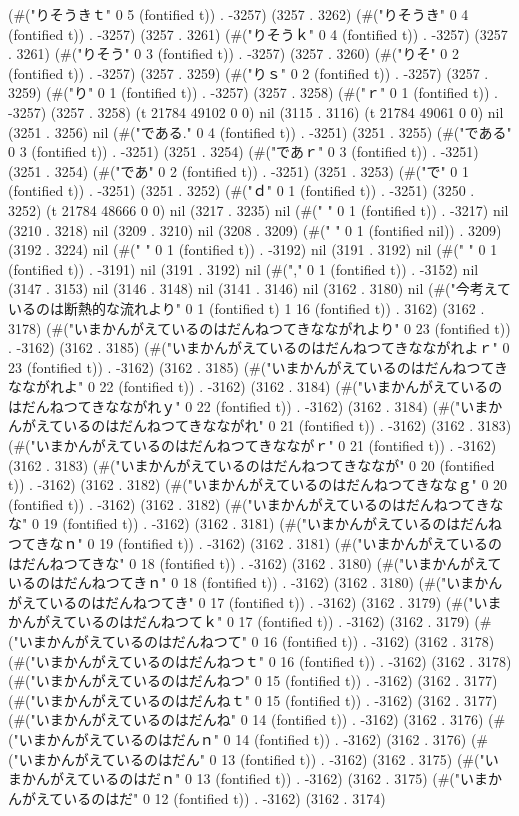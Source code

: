 (#("りそうきｔ" 0 5 (fontified t)) . -3257) (3257 . 3262) (#("りそうき" 0 4 (fontified t)) . -3257) (3257 . 3261) (#("りそうｋ" 0 4 (fontified t)) . -3257) (3257 . 3261) (#("りそう" 0 3 (fontified t)) . -3257) (3257 . 3260) (#("りそ" 0 2 (fontified t)) . -3257) (3257 . 3259) (#("りｓ" 0 2 (fontified t)) . -3257) (3257 . 3259) (#("り" 0 1 (fontified t)) . -3257) (3257 . 3258) (#("ｒ" 0 1 (fontified t)) . -3257) (3257 . 3258) (t 21784 49102 0 0) nil (3115 . 3116) (t 21784 49061 0 0) nil (3251 . 3256) nil (#("である." 0 4 (fontified t)) . -3251) (3251 . 3255) (#("である" 0 3 (fontified t)) . -3251) (3251 . 3254) (#("であｒ" 0 3 (fontified t)) . -3251) (3251 . 3254) (#("であ" 0 2 (fontified t)) . -3251) (3251 . 3253) (#("で" 0 1 (fontified t)) . -3251) (3251 . 3252) (#("ｄ" 0 1 (fontified t)) . -3251) (3250 . 3252) (t 21784 48666 0 0) nil (3217 . 3235) nil (#(" " 0 1 (fontified t)) . -3217) nil (3210 . 3218) nil (3209 . 3210) nil (3208 . 3209) (#(" " 0 1 (fontified nil)) . 3209) (3192 . 3224) nil (#(" " 0 1 (fontified t)) . -3192) nil (3191 . 3192) nil (#(" " 0 1 (fontified t)) . -3191) nil (3191 . 3192) nil (#("," 0 1 (fontified t)) . -3152) nil (3147 . 3153) nil (3146 . 3148) nil (3141 . 3146) nil (3162 . 3180) nil (#("今考えているのは断熱的な流れより" 0 1 (fontified t) 1 16 (fontified t)) . 3162) (3162 . 3178) (#("いまかんがえているのはだんねつてきなながれより" 0 23 (fontified t)) . -3162) (3162 . 3185) (#("いまかんがえているのはだんねつてきなながれよｒ" 0 23 (fontified t)) . -3162) (3162 . 3185) (#("いまかんがえているのはだんねつてきなながれよ" 0 22 (fontified t)) . -3162) (3162 . 3184) (#("いまかんがえているのはだんねつてきなながれｙ" 0 22 (fontified t)) . -3162) (3162 . 3184) (#("いまかんがえているのはだんねつてきなながれ" 0 21 (fontified t)) . -3162) (3162 . 3183) (#("いまかんがえているのはだんねつてきなながｒ" 0 21 (fontified t)) . -3162) (3162 . 3183) (#("いまかんがえているのはだんねつてきななが" 0 20 (fontified t)) . -3162) (3162 . 3182) (#("いまかんがえているのはだんねつてきななｇ" 0 20 (fontified t)) . -3162) (3162 . 3182) (#("いまかんがえているのはだんねつてきなな" 0 19 (fontified t)) . -3162) (3162 . 3181) (#("いまかんがえているのはだんねつてきなｎ" 0 19 (fontified t)) . -3162) (3162 . 3181) (#("いまかんがえているのはだんねつてきな" 0 18 (fontified t)) . -3162) (3162 . 3180) (#("いまかんがえているのはだんねつてきｎ" 0 18 (fontified t)) . -3162) (3162 . 3180) (#("いまかんがえているのはだんねつてき" 0 17 (fontified t)) . -3162) (3162 . 3179) (#("いまかんがえているのはだんねつてｋ" 0 17 (fontified t)) . -3162) (3162 . 3179) (#("いまかんがえているのはだんねつて" 0 16 (fontified t)) . -3162) (3162 . 3178) (#("いまかんがえているのはだんねつｔ" 0 16 (fontified t)) . -3162) (3162 . 3178) (#("いまかんがえているのはだんねつ" 0 15 (fontified t)) . -3162) (3162 . 3177) (#("いまかんがえているのはだんねｔ" 0 15 (fontified t)) . -3162) (3162 . 3177) (#("いまかんがえているのはだんね" 0 14 (fontified t)) . -3162) (3162 . 3176) (#("いまかんがえているのはだんｎ" 0 14 (fontified t)) . -3162) (3162 . 3176) (#("いまかんがえているのはだん" 0 13 (fontified t)) . -3162) (3162 . 3175) (#("いまかんがえているのはだｎ" 0 13 (fontified t)) . -3162) (3162 . 3175) (#("いまかんがえているのはだ" 0 12 (fontified t)) . -3162) (3162 . 3174) 